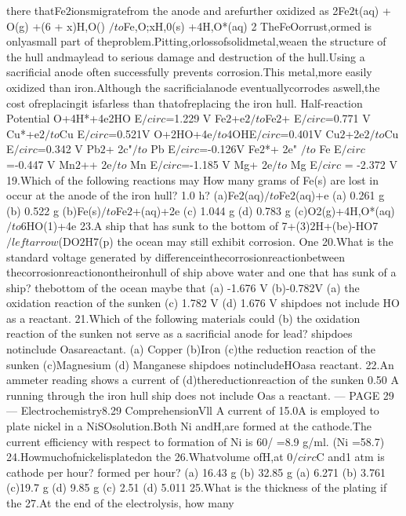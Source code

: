 \begin{problembox}
there thatFe$2$ionsmigratefrom the anode and arefurther oxidized as
2Fe$2$t(aq) + O(g) +(6 + x)H,O() $/to$Fe,O;xH,0(s) +4H,O*(aq)
2
TheFeOorrust,ormed is onlyasmall part of theproblem.Pitting,orlossofsolidmetal,weaen
the structure of the hull andmaylead to serious damage and destruction of the hull.Using a sacrificial
anode often successfully prevents corrosion.This metal,more easily oxidized than iron.Although the
sacrificialanode eventuallycorrodes aswell,the cost ofreplacingit isfarless than thatofreplacing
the iron hull.
Half-reaction
Potential
O+4H*+4e2HO
E$/circ$=1.229 V
Fe$2$+e$2$$/to$Fe$2$+
E$/circ$=0.771 V
Cu*+e$2$$/to$Cu
E$/circ$=0.521V
O+2HO+4e$/to$4OHE$/circ$=0.401V
Cu$2$+2e$2$$/to$Cu
E$/circ$=0.342 V
Pb$2$+ 2c"$/to$ Pb
E$/circ$=-0.126V
Fe$2$*+ 2e" $/to$ Fe
E$/circ$=-0.447 V
Mn$2$++ 2e$/to$ Mn
E$/circ$=-1.185 V
Mg+ 2e$/to$ Mg
E$/circ$ = -2.372 V
19.Which of the following reactions may
How many grams of Fe(s) are lost in
occur at the anode of the iron hull?
1.0 h?
(a)Fe$2$(aq)$/to$Fe$2$(aq)+e
(a) 0.261 g
(b) 0.522 g
(b)Fe(s)$/to$Fe$2$+(aq)+2e
(c) 1.044 g
(d) 0.783 g
(c)O2(g)+4H,O*(aq)$/to$6HO(1)+4e
23.A ship that has sunk to the bottom of
\underline{\hspace{1cm}}7+(3)$2$H+(be)-HO7$/leftarrow$(DO$2$H7(p)
the ocean may still exhibit corrosion. One
20.What is the standard voltage generated by
differenceinthecorrosionreactionbetween
thecorrosionreactionontheironhull of
ship above water and one that has sunk of
a ship?
thebottom of the ocean maybe that
(a) -1.676 V
(b)-0.782V
(a) the oxidation reaction of the sunken
(c) 1.782 V
(d) 1.676 V
shipdoes not include HO as a
reactant.
21.Which of the following materials could
(b) the oxidation reaction of the sunken
not serve as a sacrificial anode for lead?
shipdoes notinclude Oasareactant.
(a) Copper
(b)Iron
(c)the reduction reaction of the sunken
(c)Magnesium
(d) Manganese
shipdoes notincludeHOasa
reactant.
22.An ammeter reading shows a current of
(d)thereductionreaction of the sunken
0.50 A running through the iron hull
ship does not include Oas a reactant.
--- PAGE 29 ---
Electrochemistry8.29
ComprehensionVll
A current of 15.0A is employed to plate nickel in a NiSOsolution.Both Ni andH,are formed at
the cathode.The current efficiency with respect to formation of Ni is 60/%
=8.9 g/ml. (Ni =58.7)
24.Howmuchofnickelisplatedon the
26.Whatvolume ofH,at 0$/circ$C and1 atm is
cathode per hour?
formed per hour?
(a) 16.43 g
(b) 32.85 g
(a) 6.271
(b) 3.761
(c)19.7 g
(d) 9.85 g
(c) 2.51
(d) 5.011
25.What is the thickness of the plating if the
27.At the end of the electrolysis, how many
$$
\end{problembox}
